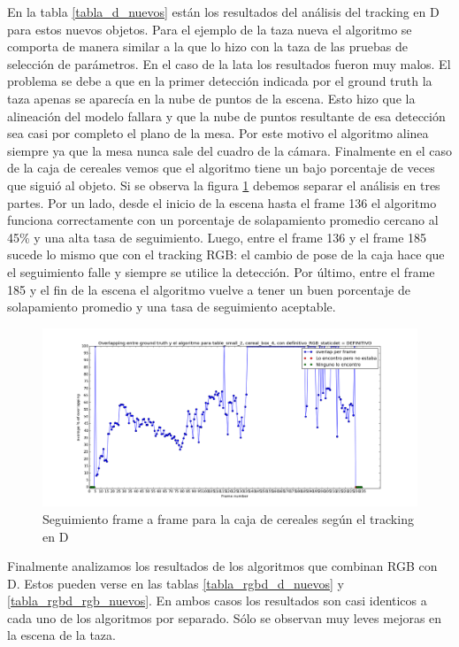 En la tabla \ref{tabla_d_nuevos} están los resultados del análisis del tracking en D para estos nuevos objetos. Para el ejemplo de la taza nueva el algoritmo se comporta de manera similar a la que lo hizo con la taza de las pruebas de selección de parámetros. En el caso de la lata los resultados fueron muy malos. El problema se debe a que en la primer detección indicada por el ground truth la taza apenas se aparecía en la nube de puntos de la escena. Esto hizo que la alineación del modelo fallara y que la nube de puntos resultante de esa detección sea casi por completo el plano de la mesa. Por este motivo el algoritmo alinea siempre ya que la mesa nunca sale del cuadro de la cámara. 
Finalmente en el caso de la caja de cereales vemos que el algoritmo tiene un bajo porcentaje de veces que siguió al objeto. Si se observa la figura \ref{frame_frame_d_nuevo} debemos separar el análisis en tres partes. Por un lado, desde el inicio de la escena hasta el frame 136 el algoritmo funciona correctamente con un porcentaje de solapamiento promedio cercano al 45\% y una alta tasa de seguimiento. Luego, entre el frame 136 y el frame 185 sucede lo mismo que con el tracking RGB: el cambio de pose de la caja hace que el seguimiento falle y siempre se utilice la detección. Por último, entre el frame 185 y el fin de la escena el algoritmo vuelve a tener un buen porcentaje de solapamiento promedio y una tasa de seguimiento aceptable.

\begin{figure}
	\centering
	\includegraphics[width=\textwidth]{img/seguimientoframeaframe-depth-nuevo-caja.png}
	\caption{Seguimiento frame a frame para la caja de cereales según el tracking en D}
	\label{frame_frame_d_nuevo}
\end{figure}


Finalmente analizamos los resultados de los algoritmos que combinan RGB con D. Estos pueden verse en las tablas \ref{tabla_rgbd_d_nuevos} y \ref{tabla_rgbd_rgb_nuevos}. En ambos casos los resultados son casi identicos a cada uno de los algoritmos por separado. Sólo se observan muy leves mejoras en la escena de la taza. 

